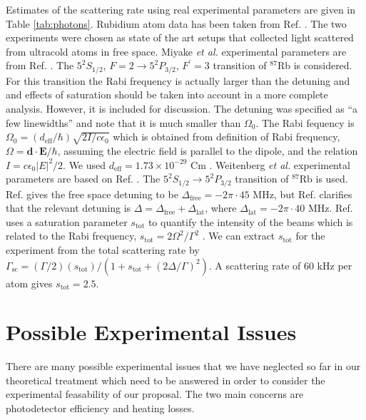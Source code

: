 Estimates of the scattering rate using real experimental parameters
are given in Table \ref{tab:photons}. Rubidium atom data has been
taken from Ref. \cite{steck}. The two experiments were chosen as state
of the art setups that collected light scattered from ultracold atoms
in free space. Miyake \emph{et al.} experimental parameters are from
Ref. \cite{miyake2011}. The $5^2S_{1/2}$,
$F=2 \rightarrow 5^2P_{3/2}$, $F^\prime = 3$ transition of $^{87}$Rb
is considered. For this transition the Rabi frequency is actually
larger than the detuning and and effects of saturation should be taken
into account in a more complete analysis. However, it is included for
discussion. The detuning was specified as ``a few linewidths'' and
note that it is much smaller than $\Omega_0$. The Rabi fequency is
$\Omega_0 = (d_\mathrm{eff}/\hbar)\sqrt{2 I / c \epsilon_0}$ which is
obtained from definition of Rabi frequency,
$\Omega = \mathbf{d} \cdot \mathbf{E} / \hbar$, assuming the electric
field is parallel to the dipole, and the relation
$I = c \epsilon_0 |E|^2 /2$. We used
$d_\mathrm{eff} = 1.73 \times 10^{-29}$ Cm \cite{steck}. Weitenberg
\emph{et al.} experimental parameters are based on
Ref. \cite{weitenberg2011, weitenbergThesis}. The
$5^2S_{1/2} \rightarrow 5^2P_{3/2}$ transition of $^{87}$Rb is
used. Ref. \cite{weitenberg2011} gives the free space detuning to be
$\Delta_\mathrm{free} = - 2 \pi \cdot 45$ MHz, but
Ref. \cite{weitenbergThesis} clarifies that the relevant detuning is
$\Delta = \Delta_\mathrm{free} + \Delta_\mathrm{lat}$, where
$\Delta_\mathrm{lat} = - 2 \pi \cdot 40$
MHz. Ref. \cite{weitenbergThesis} uses a saturation parameter
$s_\mathrm{tot}$ to quantify the intensity of the beams which is
related to the Rabi frequency,
$s_\mathrm{tot} = 2 \Omega^2 / \Gamma^2$ \cite{steck,foot}. We can
extract $s_\mathrm{tot}$ for the experiment from the total scattering
rate by
$\Gamma_\mathrm{sc} = (\Gamma/2) (s_\mathrm{tot}) /
(1+s_\mathrm{tot}+(2 \Delta / \Gamma)^2)$. A scattering rate of 60 kHz
per atom \cite{weitenberg2011} gives $s_\mathrm{tot} = 2.5$.

\section{Possible Experimental Issues}

There are many possible experimental issues that we have neglected so
far in our theoretical treatment which need to be answered in order to
consider the experimental feasability of our proposal. The two main
concerns are photodetector efficiency and heating losses.

